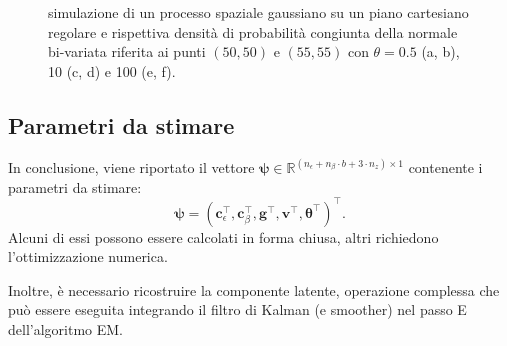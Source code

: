 \begin{figure}[h!]
	\caption[Simulazione di un processo spaziale gaussiano su un piano cartesiano al variare di $\theta$]{simulazione di un processo spaziale gaussiano su un piano cartesiano regolare e rispettiva densità di probabilità congiunta della normale bi-variata riferita ai punti $(50, 50)$ e $(55, 55)$ con $\theta=0.5$ (a, b), \num{10} (c, d) e \num{100} (e, f).}
	\label{sim_proc_gaussiano}
\end{figure}

\subsection[Parametri da stimare]{Parametri da stimare}
In conclusione, viene riportato il vettore $\boldsymbol{\psi}\in\mathbb{R}^{(n_\epsilon + n_\beta\cdot b + 3\cdot n_z)\times 1}$ contenente i parametri da stimare:
\begin{equation}
	\boldsymbol{\psi} = (\mathbf{c}_\epsilon^\top, \mathbf{c}_\beta^\top, \mathbf{g}^\top, \mathbf{v}^\top, \boldsymbol{\theta}^\top)^\top.
\end{equation}
Alcuni di essi possono essere calcolati in forma chiusa, altri richiedono l'ottimizzazione numerica.
\par Inoltre, è necessario ricostruire la componente latente, operazione complessa che può essere eseguita integrando il filtro di Kalman (e smoother) nel passo E dell'algoritmo EM.

